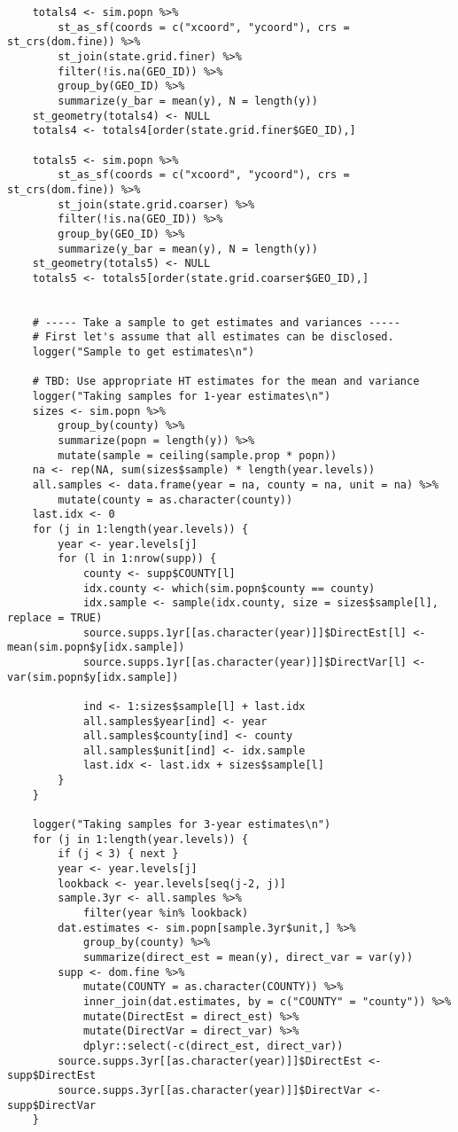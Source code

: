 \documentclass[12pt]{article}
\begin{document}
\begin{scriptsize}
\begin{verbatim}
    totals4 <- sim.popn %>%
        st_as_sf(coords = c("xcoord", "ycoord"), crs = st_crs(dom.fine)) %>%
        st_join(state.grid.finer) %>%
        filter(!is.na(GEO_ID)) %>%
        group_by(GEO_ID) %>%
        summarize(y_bar = mean(y), N = length(y))
    st_geometry(totals4) <- NULL
    totals4 <- totals4[order(state.grid.finer$GEO_ID),]

    totals5 <- sim.popn %>%
        st_as_sf(coords = c("xcoord", "ycoord"), crs = st_crs(dom.fine)) %>%
        st_join(state.grid.coarser) %>%
        filter(!is.na(GEO_ID)) %>%
        group_by(GEO_ID) %>%
        summarize(y_bar = mean(y), N = length(y))
    st_geometry(totals5) <- NULL
    totals5 <- totals5[order(state.grid.coarser$GEO_ID),]


    # ----- Take a sample to get estimates and variances -----
    # First let's assume that all estimates can be disclosed.
    logger("Sample to get estimates\n")

    # TBD: Use appropriate HT estimates for the mean and variance
    logger("Taking samples for 1-year estimates\n")
    sizes <- sim.popn %>%
        group_by(county) %>%
        summarize(popn = length(y)) %>%
        mutate(sample = ceiling(sample.prop * popn))
    na <- rep(NA, sum(sizes$sample) * length(year.levels))
    all.samples <- data.frame(year = na, county = na, unit = na) %>%
        mutate(county = as.character(county))
    last.idx <- 0
    for (j in 1:length(year.levels)) {
        year <- year.levels[j]
        for (l in 1:nrow(supp)) {
            county <- supp$COUNTY[l]
            idx.county <- which(sim.popn$county == county)
            idx.sample <- sample(idx.county, size = sizes$sample[l], replace = TRUE)
            source.supps.1yr[[as.character(year)]]$DirectEst[l] <- mean(sim.popn$y[idx.sample])
            source.supps.1yr[[as.character(year)]]$DirectVar[l] <- var(sim.popn$y[idx.sample])

            ind <- 1:sizes$sample[l] + last.idx
            all.samples$year[ind] <- year
            all.samples$county[ind] <- county
            all.samples$unit[ind] <- idx.sample
            last.idx <- last.idx + sizes$sample[l]
        }
    }

    logger("Taking samples for 3-year estimates\n")
    for (j in 1:length(year.levels)) {
        if (j < 3) { next }
        year <- year.levels[j]
        lookback <- year.levels[seq(j-2, j)]
        sample.3yr <- all.samples %>%
            filter(year %in% lookback)
        dat.estimates <- sim.popn[sample.3yr$unit,] %>%
            group_by(county) %>%
            summarize(direct_est = mean(y), direct_var = var(y))
        supp <- dom.fine %>%
            mutate(COUNTY = as.character(COUNTY)) %>%
            inner_join(dat.estimates, by = c("COUNTY" = "county")) %>%
            mutate(DirectEst = direct_est) %>%
            mutate(DirectVar = direct_var) %>%
            dplyr::select(-c(direct_est, direct_var))
        source.supps.3yr[[as.character(year)]]$DirectEst <- supp$DirectEst
        source.supps.3yr[[as.character(year)]]$DirectVar <- supp$DirectVar
    }


\end{verbatim}
\end{scriptsize}
\end{document}
